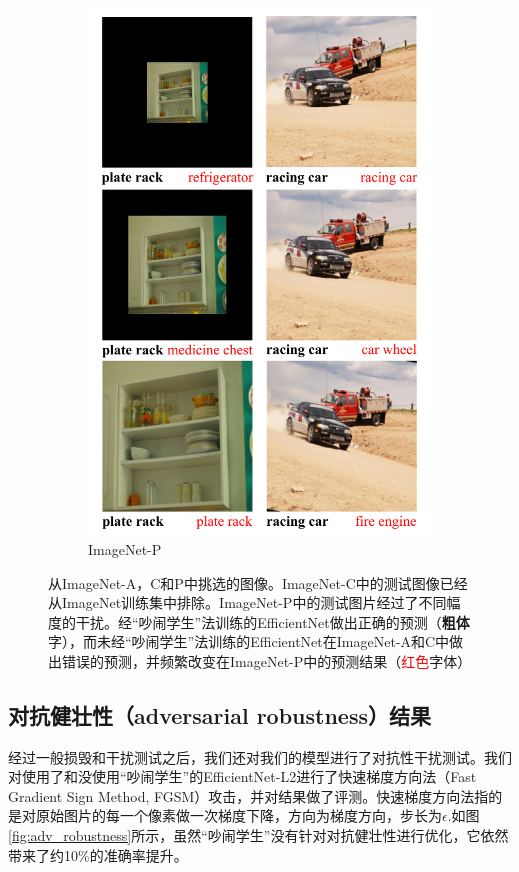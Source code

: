 \documentclass[10pt]{article}
\begin{document}
\begin{figure}[!htb]
\begin{subfigure}{.33\textwidth}
		\includegraphics[width=\linewidth]{fig/imagenet_p}
		\caption{ImageNet-P}
		\label{fig:imagenet_p}
	\end{subfigure}\hfill
	\caption{从ImageNet-A，C和P中挑选的图像。ImageNet-C中的测试图像已经从ImageNet训练集中排除。ImageNet-P中的测试图片经过了不同幅度的干扰。经“吵闹学生”法训练的EfficientNet做出正确的预测（\textbf{粗体}字），而未经“吵闹学生”法训练的EfficientNet在ImageNet-A和C中做出错误的预测，并频繁改变在ImageNet-P中的预测结果（\textcolor{red}{红色}字体）}
	\label{fig:robustnessacp}
\end{figure}

\subsection{对抗健壮性（adversarial robustness）结果}
经过一般损毁和干扰测试之后，我们还对我们的模型进行了对抗性干扰测试。我们对使用了和没使用“吵闹学生”的EfficientNet-L2进行了快速梯度方向法（Fast Gradient Sign Method, FGSM）攻击，并对结果做了评测。快速梯度方向法指的是对原始图片的每一个像素做一次梯度下降\cite{goodfellow2014explaining}，方向为梯度方向，步长为$\epsilon$.如图\ref{fig:adv_robustness}所示，虽然“吵闹学生”没有针对对抗健壮性进行优化，它依然带来了约10\%的准确率提升。  
\end{document}
